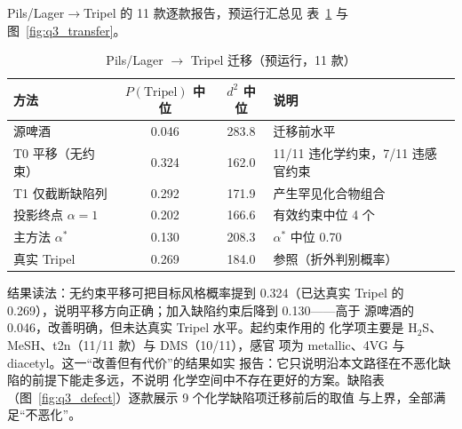 \documentclass[12pt,a4paper]{article}
\begin{document}
Pils/Lager$\to$Tripel 的 11 款逐款报告，预运行汇总见
表~\ref{tab:q3_transfer} 与图~\ref{fig:q3_transfer}。

\begin{table}[!htbp]
  \centering\small
  \caption{Pils/Lager $\to$ Tripel 迁移（预运行，11 款）}
  \label{tab:q3_transfer}
  \begin{tabular}{lccl}
    \toprule
    方法 & $P(\text{Tripel})$ 中位 & $d^2$ 中位 & 说明 \\
    \midrule
    源啤酒 & 0.046 & 283.8 & 迁移前水平 \\
    T0 平移（无约束） & 0.324 & 162.0 & 11/11 违化学约束，7/11 违感官约束 \\
    T1 仅截断缺陷列 & 0.292 & 171.9 & 产生罕见化合物组合 \\
    投影终点 $\alpha=1$ & 0.202 & 166.6 & 有效约束中位 4 个 \\
    主方法 $\alpha^*$ & 0.130 & 208.3 & $\alpha^*$ 中位 0.70 \\
    真实 Tripel & 0.269 & 184.0 & 参照（折外判别概率） \\
    \bottomrule
  \end{tabular}
\end{table}


结果读法：无约束平移可把目标风格概率提到 0.324（已达真实 Tripel
的 0.269），说明平移方向正确；加入缺陷约束后降到 0.130——高于
源啤酒的 0.046，改善明确，但未达真实 Tripel 水平。起约束作用的
化学项主要是 H$_2$S、MeSH、t2n（11/11 款）与 DMS（10/11），感官
项为 metallic、4VG 与 diacetyl。这一``改善但有代价''的结果如实
报告：它只说明沿本文路径在不恶化缺陷的前提下能走多远，不说明
化学空间中不存在更好的方案。缺陷表
（图~\ref{fig:q3_defect}）逐款展示 9 个化学缺陷项迁移前后的取值
与上界，全部满足``不恶化''。

\end{document}
